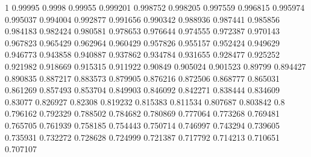 \def\pgf@def#1#2#3{\expandafter\def\csname pgf@#1#2\endcsname{#3}}
\pgf@def{cosfrac}{0}{1}
\pgf@def{cosfrac}{1}{0.99995}    \pgf@def{cosfrac}{2}{0.9998}
\pgf@def{cosfrac}{3}{0.99955}    \pgf@def{cosfrac}{4}{0.999201}
\pgf@def{cosfrac}{5}{0.998752}   \pgf@def{cosfrac}{6}{0.998205}
\pgf@def{cosfrac}{7}{0.997559}   \pgf@def{cosfrac}{8}{0.996815}
\pgf@def{cosfrac}{9}{0.995974}   \pgf@def{cosfrac}{10}{0.995037}
\pgf@def{cosfrac}{11}{0.994004}  \pgf@def{cosfrac}{12}{0.992877}
\pgf@def{cosfrac}{13}{0.991656}  \pgf@def{cosfrac}{14}{0.990342}
\pgf@def{cosfrac}{15}{0.988936}  \pgf@def{cosfrac}{16}{0.987441}
\pgf@def{cosfrac}{17}{0.985856}  \pgf@def{cosfrac}{18}{0.984183}
\pgf@def{cosfrac}{19}{0.982424}  \pgf@def{cosfrac}{20}{0.980581}
\pgf@def{cosfrac}{21}{0.978653}  \pgf@def{cosfrac}{22}{0.976644}
\pgf@def{cosfrac}{23}{0.974555}  \pgf@def{cosfrac}{24}{0.972387}
\pgf@def{cosfrac}{25}{0.970143}  \pgf@def{cosfrac}{26}{0.967823}
\pgf@def{cosfrac}{27}{0.965429}  \pgf@def{cosfrac}{28}{0.962964}
\pgf@def{cosfrac}{29}{0.960429}  \pgf@def{cosfrac}{30}{0.957826}
\pgf@def{cosfrac}{31}{0.955157}  \pgf@def{cosfrac}{32}{0.952424}
\pgf@def{cosfrac}{33}{0.949629}  \pgf@def{cosfrac}{34}{0.946773}
\pgf@def{cosfrac}{35}{0.943858}  \pgf@def{cosfrac}{36}{0.940887}
\pgf@def{cosfrac}{37}{0.937862}  \pgf@def{cosfrac}{38}{0.934784}
\pgf@def{cosfrac}{39}{0.931655}  \pgf@def{cosfrac}{40}{0.928477}
\pgf@def{cosfrac}{41}{0.925252}  \pgf@def{cosfrac}{42}{0.921982}
\pgf@def{cosfrac}{43}{0.918669}  \pgf@def{cosfrac}{44}{0.915315}
\pgf@def{cosfrac}{45}{0.911922}  \pgf@def{cosfrac}{46}{0.90849}
\pgf@def{cosfrac}{47}{0.905024}  \pgf@def{cosfrac}{48}{0.901523}
\pgf@def{cosfrac}{49}{0.89799}   \pgf@def{cosfrac}{50}{0.894427}
\pgf@def{cosfrac}{51}{0.890835}  \pgf@def{cosfrac}{52}{0.887217}
\pgf@def{cosfrac}{53}{0.883573}  \pgf@def{cosfrac}{54}{0.879905}
\pgf@def{cosfrac}{55}{0.876216}  \pgf@def{cosfrac}{56}{0.872506}
\pgf@def{cosfrac}{57}{0.868777}  \pgf@def{cosfrac}{58}{0.865031}
\pgf@def{cosfrac}{59}{0.861269}  \pgf@def{cosfrac}{60}{0.857493}
\pgf@def{cosfrac}{61}{0.853704}  \pgf@def{cosfrac}{62}{0.849903}
\pgf@def{cosfrac}{63}{0.846092}  \pgf@def{cosfrac}{64}{0.842271}
\pgf@def{cosfrac}{65}{0.838444}  \pgf@def{cosfrac}{66}{0.834609}
\pgf@def{cosfrac}{67}{0.83077}   \pgf@def{cosfrac}{68}{0.826927}
\pgf@def{cosfrac}{69}{0.82308}   \pgf@def{cosfrac}{70}{0.819232}
\pgf@def{cosfrac}{71}{0.815383}  \pgf@def{cosfrac}{72}{0.811534}
\pgf@def{cosfrac}{73}{0.807687}  \pgf@def{cosfrac}{74}{0.803842}
\pgf@def{cosfrac}{75}{0.8}       \pgf@def{cosfrac}{76}{0.796162}
\pgf@def{cosfrac}{77}{0.792329}  \pgf@def{cosfrac}{78}{0.788502}
\pgf@def{cosfrac}{79}{0.784682}  \pgf@def{cosfrac}{80}{0.780869}
\pgf@def{cosfrac}{81}{0.777064}  \pgf@def{cosfrac}{82}{0.773268}
\pgf@def{cosfrac}{83}{0.769481}  \pgf@def{cosfrac}{84}{0.765705}
\pgf@def{cosfrac}{85}{0.761939}  \pgf@def{cosfrac}{86}{0.758185}
\pgf@def{cosfrac}{87}{0.754443}  \pgf@def{cosfrac}{88}{0.750714}
\pgf@def{cosfrac}{89}{0.746997}  \pgf@def{cosfrac}{90}{0.743294}
\pgf@def{cosfrac}{91}{0.739605}  \pgf@def{cosfrac}{92}{0.735931}
\pgf@def{cosfrac}{93}{0.732272}  \pgf@def{cosfrac}{94}{0.728628}
\pgf@def{cosfrac}{95}{0.724999}  \pgf@def{cosfrac}{96}{0.721387}
\pgf@def{cosfrac}{97}{0.717792}  \pgf@def{cosfrac}{98}{0.714213}
\pgf@def{cosfrac}{99}{0.710651}  \pgf@def{cosfrac}{100}{0.707107}

\endinput
